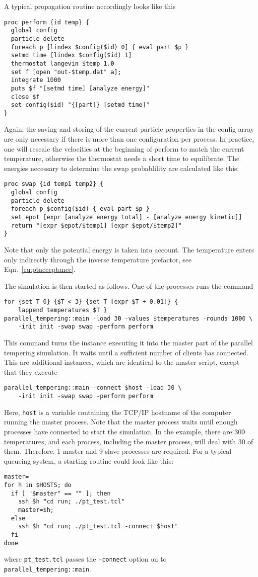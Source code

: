 A typical propagation routine accordingly looks like this
\begin{verbatim}
proc perform {id temp} {
  global config
  particle delete
  foreach p [lindex $config($id) 0] { eval part $p }
  setmd time [lindex $config($id) 1]
  thermostat langevin $temp 1.0
  set f [open "out-$temp.dat" a];
  integrate 1000
  puts $f "[setmd time] [analyze energy]"
  close $f
  set config($id) "{[part]} [setmd time]"
}
\end{verbatim}
Again, the saving and storing of the current particle properties in the config array are only
necessary if there is more than one configuration per process. In practice, one will rescale the
velocities at the beginning of perform to match the current temperature, otherwise the thermostat
needs a short time to equilibrate. The energies necessary to determine the swap probablility are
calculated like this:
\begin{verbatim}
proc swap {id temp1 temp2} {
  global config
  particle delete
  foreach p $config($id) { eval part $p }
  set epot [expr [analyze energy total] - [analyze energy kinetic]]
  return "[expr $epot/$temp1] [expr $epot/$temp2]"
}
\end{verbatim}
Note that only the potential energy is taken into account. The temperature enters only indirectly
through the inverse temperature prefactor, see Eqn.~\eqref{eq:ptacceptance}.

The simulation is then started as follows. One of the processes runs the command
\begin{verbatim}
for {set T 0} {$T < 3} {set T [expr $T + 0.01]} {
    lappend temperatures $T }
parallel_tempering::main -load 30 -values $temperatures -rounds 1000 \
    -init init -swap swap -perform perform
\end{verbatim}
This command turns the \es instance executing it into the master part of the parallel tempering
simulation. It waits until a sufficient number of clients has connected. This are additional \es{}
instances, which are identical to the master script, except that they execute
\begin{verbatim}
parallel_tempering::main -connect $host -load 30 \
    -init init -swap swap -perform perform
\end{verbatim}
Here, \texttt{host} is a variable containing the TCP/IP hostname of the computer running the master
process. Note that the master process waits until enough processes have connected to start the
simulation. In the example, there are 300 temperatures, and each process, including the master
process, will deal with 30 of them. Therefore, 1 master and 9 slave processes are required. For a
typical queueing system, a starting routine could look like this:
\begin{verbatim}
master=
for h in $HOSTS; do
  if [ "$master" == "" ]; then
    ssh $h "cd run; ./pt_test.tcl"
    master=$h;
  else
    ssh $h "cd run; ./pt_test.tcl -connect $host"
  fi
done
\end{verbatim}
where \texttt{pt_test.tcl} passes the \texttt{-connect} option on to \texttt{parallel_tempering::main}.

